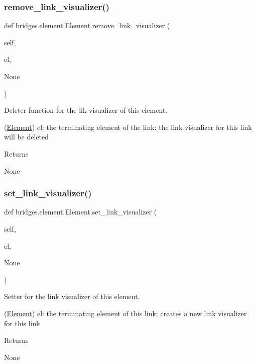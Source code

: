 \subsubsection{\texorpdfstring{remove\+\_\+link\+\_\+visualizer()}{remove\_link\_visualizer()}}
{\footnotesize\ttfamily def bridges.\+element.\+Element.\+remove\+\_\+link\+\_\+visualizer (\begin{DoxyParamCaption}\item[{}]{self,  }\item[{}]{el,  }\item[{}]{None }\end{DoxyParamCaption})}



Deleter function for the lik visualizer of this element. 

(\hyperlink{classbridges_1_1element_1_1_element}{Element}) el\+: the terminating element of the link; the link visualizer for this link will be deleted \begin{DoxyReturn}{Returns}


None 
\end{DoxyReturn}
\mbox{\label{classbridges_1_1element_1_1_element_afe94604116e0dec9a60a4ea54a462323}} 
\subsubsection{\texorpdfstring{set\+\_\+link\+\_\+visualizer()}{set\_link\_visualizer()}}
{\footnotesize\ttfamily def bridges.\+element.\+Element.\+set\+\_\+link\+\_\+visualizer (\begin{DoxyParamCaption}\item[{}]{self,  }\item[{}]{el,  }\item[{}]{None }\end{DoxyParamCaption})}



Setter for the link visualizer of this element. 

(\hyperlink{classbridges_1_1element_1_1_element}{Element}) el\+: the terminating element of this link; creates a new link visualizer for this link \begin{DoxyReturn}{Returns}


None 
\end{DoxyReturn}
\mbox{\label{classbridges_1_1element_1_1_element_aa1387621f7afa6b6f6acd052a1126320}} 
